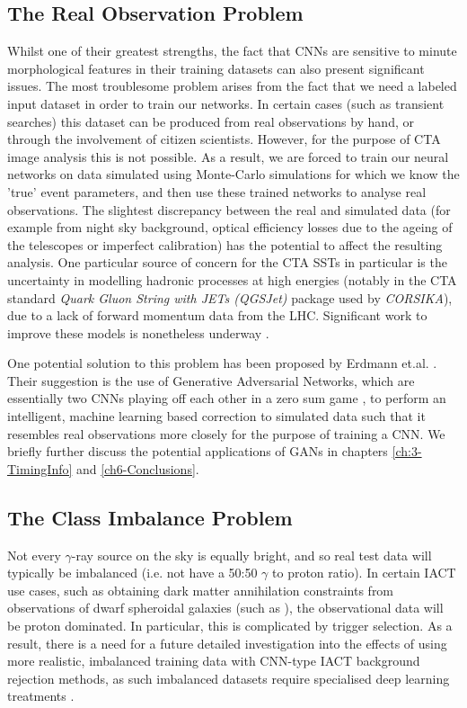 \subsection{The Real Observation Problem}
Whilst one of their greatest strengths, the fact that CNNs are sensitive to minute morphological features in their training datasets can also present significant issues. The most troublesome problem arises from the fact that we need a labeled input dataset in order to train our networks. In certain cases (such as transient searches\cite{SNH}) this dataset can be produced from real observations by hand, or through the involvement of citizen scientists. However, for the purpose of CTA image analysis this is not possible. As a result, we are forced to train our neural networks on data simulated using Monte-Carlo simulations for which we know the 'true' event parameters, and then use these trained networks to analyse real observations. The slightest discrepancy between the real and simulated data (for example from night sky background, optical efficiency losses due to the ageing of the telescopes or imperfect calibration) has the potential to affect the resulting analysis. One particular source of concern for the CTA SSTs in particular is the uncertainty in modelling hadronic processes at high energies (notably in the CTA standard \textit{Quark Gluon String with JETs (QGSJet)} package used by \textit{CORSIKA}), due to a lack of forward momentum data from the LHC. Significant work to improve these models is nonetheless underway \cite{hadronmodel}.

One potential solution to this problem has been proposed by Erdmann et.al. \cite{ErdmannAuger}. Their suggestion is the use of Generative Adversarial Networks, which are essentially two CNNs playing off each other in a zero sum game \cite{goodfellow2016deep}, to perform an intelligent, machine learning based correction to simulated data such that it resembles real observations more closely for the purpose of training a CNN. We briefly further discuss the potential applications of GANs in chapters \ref{ch:3-TimingInfo} and \ref{ch6-Conclusions}.

\subsection{The Class Imbalance Problem}

Not every $\gamma$-ray source on the sky is equally bright, and so real test data will typically be imbalanced (i.e. not have a 50:50 $\gamma$ to proton ratio). In certain IACT use cases, such as obtaining dark matter annihilation constraints from observations of dwarf spheroidal galaxies (such as \cite{gloryduck}), the observational data will be proton dominated. In particular, this is complicated by trigger selection. As a result, there is a need for a future detailed investigation into the effects of using more realistic, imbalanced training data with CNN-type IACT background rejection methods, as such imbalanced datasets require specialised deep learning treatments \cite{imbalance}.

